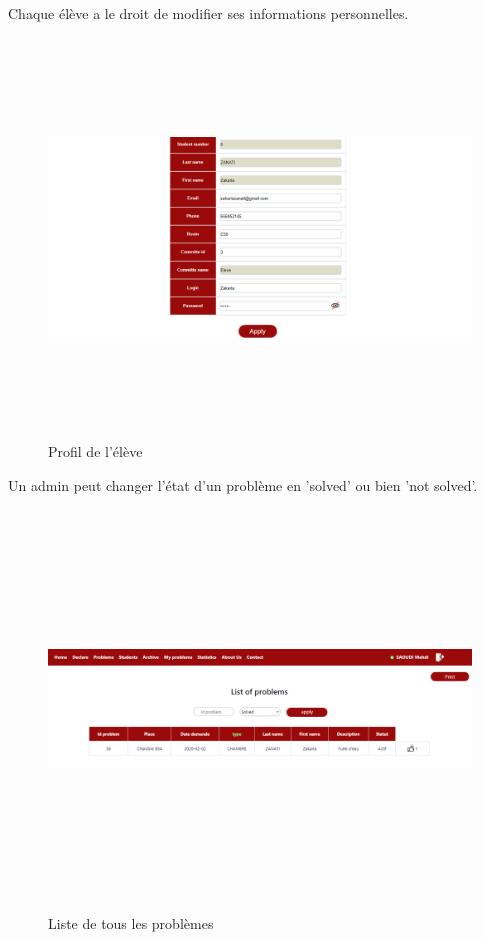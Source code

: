 \documentclass[11.5pt]{report}
\begin{document}
\newpage
Chaque élève a le droit de modifier ses informations personnelles.\\
\begin{figure}[h]
	
	\begin{center}
		\includegraphics[width=500pt,height=300pt]{profile.png} 
		\caption{Profil de l'élève}
	\end{center}
	
\end{figure}
\newpage
Un admin peut changer l'état d'un problème en 'solved' ou bien 'not solved'.
\begin{figure}[h]
	
	\begin{center}
		\includegraphics[width=500pt,height=300pt]{problems-admin.png} 
		\caption{Liste de tous les problèmes }
	\end{center}
	
\end{figure}
\end{document}
